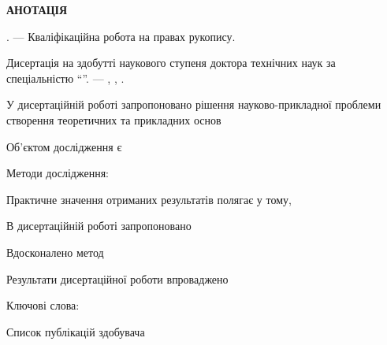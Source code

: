 \clearpage

\begin{center}
\textbf{АНОТАЦІЯ}
\end{center}

\medskip

\textit{\dissauthorUa} \booknameUa.
--- Кваліфікаційна робота на правах рукопису.

Дисертація на здобутті наукового ступеня доктора технічних наук за спеціальністю
\dissSpecId ``\dissSpecUa''. --- \institutionUa, \belongUa, \bookyear.

У дисертаційній роботі запропоновано рішення науково-прикладної проблеми
створення теоретичних та прикладних основ

Об'єктом дослідження є 

Методи дослідження:

Практичне значення отриманих результатів полягає у тому,

В дисертаційній роботі запропоновано

Вдосконалено метод


Результати дисертаційної роботи впроваджено

Ключові слова:

\medskip

\begin{center}
Список публікацій здобувача
\end{center}





